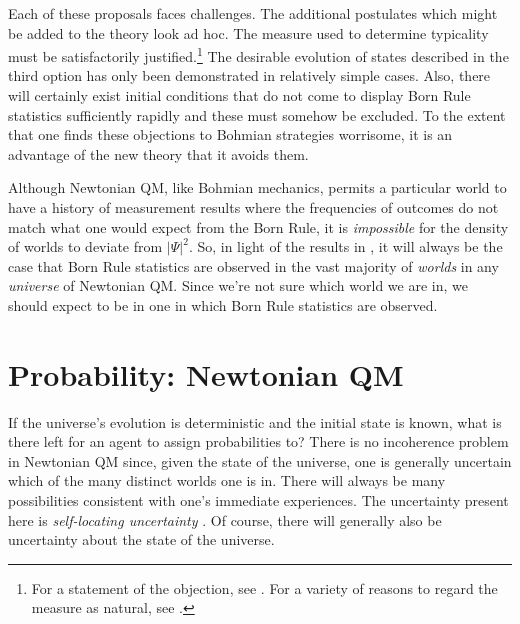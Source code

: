 \documentclass[12pt,secnumarabic,balancelastpage,amsmath,amssymb,nofootinbib]{article}
\begin{document}
Each of these proposals faces challenges.  The additional postulates which might be added to the theory look ad hoc.  The measure used to determine typicality must be satisfactorily justified.\footnote{For a statement of the objection, see \citet[]{dickson1998}.  For a variety of reasons to regard the measure as natural, see \citet{struyvegoldstein}.}  The desirable evolution of states described in the third option has only been demonstrated in relatively simple cases.  Also, there will certainly exist initial conditions that do not come to display Born Rule statistics sufficiently rapidly and these must somehow be excluded.  To the extent that one finds these objections to Bohmian strategies worrisome, it is an advantage of the new theory that it avoids them.

Although Newtonian QM, like Bohmian mechanics, permits a particular world to have a history of measurement results where the frequencies of outcomes do not match what one would expect from the Born Rule, it is \emph{impossible} for the density of worlds to deviate from $|\Psi|^2$.  So, in light of the results in \citet{durr1992}, it will always be the case that Born Rule statistics are observed in the vast majority of \emph{worlds} in any \emph{universe} of Newtonian QM.  Since we're not sure which world we are in, we should expect to be in one in which Born Rule statistics are observed.

\section{Probability: Newtonian QM}\label{probNQM}

If the universe's evolution is deterministic and the initial state is known, what is there left for an agent to assign probabilities to?  There is no incoherence problem in Newtonian QM since, given the state of the universe, one is generally uncertain which of the many distinct worlds one is in.  There will always be many possibilities consistent with one's immediate experiences.  The uncertainty present here is \emph{self-locating uncertainty} \citep[see][]{lewis1979}.  Of course, there will generally also be uncertainty about the state of the universe.
\end{document}
